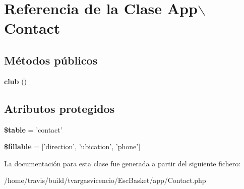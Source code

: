 \hypertarget{class_app_1_1_contact}{\section{\-Referencia de la \-Clase \-App$\backslash$\-Contact}
\label{class_app_1_1_contact}
}
\subsection*{\-Métodos públicos}
\begin{DoxyCompactItemize}
\item 
\hypertarget{class_app_1_1_contact_a228dd6d54c1bcb7d1a0fbf9e2b3741ac}{{\bfseries club} ()}\label{class_app_1_1_contact_a228dd6d54c1bcb7d1a0fbf9e2b3741ac}

\end{DoxyCompactItemize}
\subsection*{\-Atributos protegidos}
\begin{DoxyCompactItemize}
\item 
\hypertarget{class_app_1_1_contact_ab82b88ad47c9fd307219d066c058c6bb}{{\bfseries \$table} = 'contact'}\label{class_app_1_1_contact_ab82b88ad47c9fd307219d066c058c6bb}

\item 
\hypertarget{class_app_1_1_contact_aab43da39d2fce70cf34a931addf18548}{{\bfseries \$fillable} = \mbox{[}'direction', 'ubication', 'phone'\mbox{]}}\label{class_app_1_1_contact_aab43da39d2fce70cf34a931addf18548}

\end{DoxyCompactItemize}


\-La documentación para esta clase fue generada a partir del siguiente fichero\-:\begin{DoxyCompactItemize}
\item 
/home/travis/build/tvargasvicencio/\-Esc\-Basket/app/\-Contact.\-php\end{DoxyCompactItemize}
